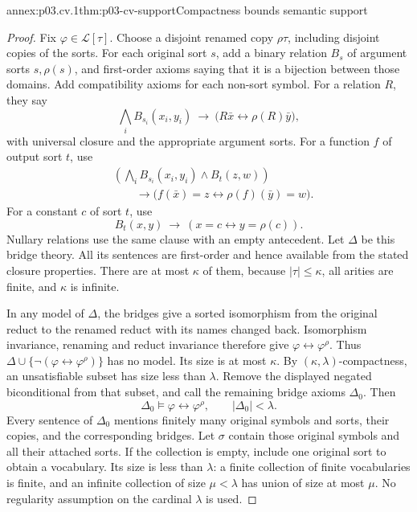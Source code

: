 \begin{annexitem}{annex:p03.cv.1}{thm:p03-cv-support}{Compactness bounds semantic support}
\begin{proof}
Fix \(\varphi\in\mathscr L[\tau]\). Choose a disjoint renamed
copy \(\rho\tau\), including disjoint copies of the sorts.
For each original sort \(s\), add a binary relation \(B_s\)
of argument sorts \(s,\rho(s)\), and first-order axioms saying
that it is a bijection between those domains. Add compatibility
axioms for each non-sort symbol. For a relation \(R\), they say
\[
 \bigwedge_i B_{s_i}(x_i,y_i)
       \ \longrightarrow\
       \bigl(R\bar x\leftrightarrow\rho(R)\bar y\bigr),
\]
with universal closure and the appropriate argument sorts. For a
function \(f\) of output sort \(t\), use
\[
 \begin{aligned}
 &\left(\bigwedge_i B_{s_i}(x_i,y_i)\land B_t(z,w)\right)\\
 &\hspace{2em}\longrightarrow
       \bigl(f(\bar x)=z\leftrightarrow\rho(f)(\bar y)=w\bigr).
 \end{aligned}
\]
For a constant \(c\) of sort \(t\), use
\[
 B_t(x,y)\ \longrightarrow\ (x=c\leftrightarrow y=\rho(c)).
\]
Nullary relations use the same clause with an empty antecedent.
Let \(\Delta\) be this bridge theory. All its sentences are
first-order and hence available from the stated closure properties.
There are at most \(\kappa\) of them, because
\(|\tau|\leq\kappa\), all arities are finite, and \(\kappa\)
is infinite.

In any model of \(\Delta\), the bridges give a sorted
isomorphism from the original reduct to the renamed reduct with
its names changed back. Isomorphism invariance, renaming and
reduct invariance therefore give
\(\varphi\leftrightarrow\varphi^\rho\).
Thus \(\Delta\cup\{\neg(\varphi\leftrightarrow\varphi^\rho)\}\)
has no model. Its size is at most \(\kappa\).
By \((\kappa,\lambda)\)-compactness, an unsatisfiable subset
has size less than \(\lambda\). Remove the displayed negated
biconditional from that subset, and call the remaining bridge
axioms \(\Delta_0\). Then
\[
 \Delta_0\models\varphi\leftrightarrow\varphi^\rho,
 \qquad |\Delta_0|<\lambda.
\]
Every sentence of \(\Delta_0\) mentions finitely many original
symbols and sorts, their copies, and the corresponding bridges.
Let \(\sigma\) contain those original symbols and all their
attached sorts. If the collection is empty, include one original
sort to obtain a vocabulary. Its size is less than \(\lambda\):
a finite collection of finite vocabularies is finite, and an
infinite collection of size \(\mu<\lambda\) has union of size
at most \(\mu\). No regularity assumption on the cardinal
\(\lambda\) is used.


\end{proof}
\end{annexitem}
